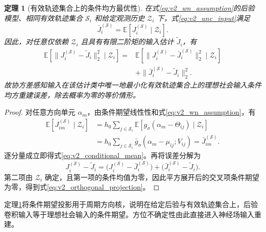 \documentclass[UTF8,fontset=windows,11pt]{ctexart}
\newtheorem{theorem}{定理}[section]
\newcommand{\E}{\mathbb E}
\begin{document}
\begin{theorem}[有效轨迹集合上的条件均方最优性]
\label{thm:v2_mmse}
在式\eqref{eq:v2_wn_assumption}的后验模型、相同有效轨迹集合 $\mathcal S_i$ 和给定观测历史 $\mathcal Z_i$ 下，式\eqref{eq:v2_unc_input}满足
\begin{equation}
 \bar J_i^{(\mathcal S)}=\E[J_i^{(\mathcal S)}\mid\mathcal Z_i].
 \label{eq:v2_conditional_mean}
\end{equation}
因此，对任意仅依赖 $\mathcal Z_i$ 且具有有限二阶矩的输入估计 $\widetilde J_i$，有
\begin{equation}
 \begin{aligned}
 \E[\|J_i^{(\mathcal S)}-\widetilde J_i\|_2^2\mid\mathcal Z_i]
 ={}&\E[\|J_i^{(\mathcal S)}-\bar J_i^{(\mathcal S)}\|_2^2\mid\mathcal Z_i]\\
 &+\|\bar J_i^{(\mathcal S)}-\widetilde J_i\|_2^2.
 \end{aligned}
 \label{eq:v2_orthogonal_projection}
\end{equation}
故协方差感知输入在该估计类中唯一地最小化有效轨迹集合上的理想社会输入条件均方重建误差，除去概率为零的等价情形。
\end{theorem}

\begin{proof}
对任意方向单元 $\alpha_m$，由条件期望线性性和式\eqref{eq:v2_wn_assumption}，有
\begin{equation}
 \begin{aligned}
 \E[J_{im}^{(\mathcal S)}\mid\mathcal Z_i]
 &=h_0\sum_{j\in\mathcal S_i}
 \E[g_\sigma(\alpha_m-\Theta_{ij})\mid\mathcal Z_i]\\
 &=h_0\sum_{j\in\mathcal S_i}
 \bar g_\sigma(\alpha_m-\mu_{ij};V_{ij})
 =\bar J_{im}^{(\mathcal S)}.
 \end{aligned}
 \label{eq:v2_component_expectation}
\end{equation}
逐分量成立即得式\eqref{eq:v2_conditional_mean}。再将误差分解为
\begin{equation}
 J_i^{(\mathcal S)}-\widetilde J_i
 =\bigl(J_i^{(\mathcal S)}-\bar J_i^{(\mathcal S)}\bigr)
 +\bigl(\bar J_i^{(\mathcal S)}-\widetilde J_i\bigr).
 \label{eq:v2_error_decomposition}
\end{equation}
第二项由 $\mathcal Z_i$ 确定，且第一项的条件均值为零，因此平方展开后的交叉项条件期望为零，得到式\eqref{eq:v2_orthogonal_projection}。
\end{proof}

定理\ref{thm:v2_mmse}将条件期望投影用于周期方向核，说明在给定后验与有效轨迹集合上，后验卷积输入等于理想社会输入的条件期望。方位不确定性由此直接进入神经场输入重建。
\end{document}
